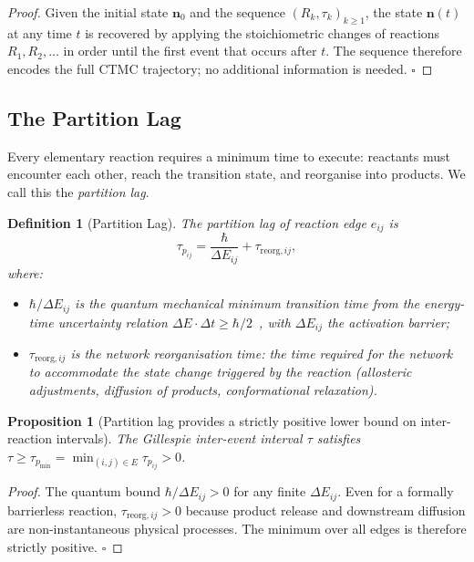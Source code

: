 \documentclass[twocolumn,10pt,a4paper]{article}
\newcommand{\taup}{\tau_p}
\newtheorem{proposition}[theorem]{Proposition}
\newtheorem{definition}[theorem]{Definition}
\begin{document}
\begin{proof}
Given the initial state $\mathbf{n}_0$ and the sequence $(R_k,\tau_k)_{k\geq 1}$,
the state $\mathbf{n}(t)$ at any time $t$ is recovered by applying the
stoichiometric changes of reactions $R_1,R_2,\ldots$ in order until the first
event that occurs after $t$.  The sequence therefore encodes the full CTMC
trajectory; no additional information is needed.  $\square$
\end{proof}

\subsection{The Partition Lag}
\label{sec:time-lag}

Every elementary reaction requires a minimum time to execute: reactants must
encounter each other, reach the transition state, and reorganise into products.
We call this the \emph{partition lag}.

\begin{definition}[Partition Lag]
\label{def:partition-lag}
The \emph{partition lag} of reaction edge $e_{ij}$ is
\begin{equation}
  \taup_{ij} = \frac{\hbar}{\Delta E_{ij}} + \tau_{\mathrm{reorg},ij},
  \label{eq:partition-lag}
\end{equation}
where:
\begin{itemize}[noitemsep]
  \item $\hbar/\Delta E_{ij}$ is the quantum mechanical minimum transition time
        from the energy-time uncertainty relation
        $\Delta E\cdot\Delta t\geq\hbar/2$~\cite{Heisenberg1927}, with
        $\Delta E_{ij}$ the activation barrier;
  \item $\tau_{\mathrm{reorg},ij}$ is the network reorganisation time: the
        time required for the network to accommodate the state change triggered
        by the reaction (allosteric adjustments, diffusion of products,
        conformational relaxation).
\end{itemize}
\end{definition}

\begin{proposition}[Partition lag provides a strictly positive lower bound on inter-reaction intervals]
\label{prop:lag-minimum}
The Gillespie inter-event interval $\tau$ satisfies
$\tau\geq\taup_{\min}=\min_{(i,j)\in E}\taup_{ij}>0$.
\end{proposition}

\begin{proof}
The quantum bound $\hbar/\Delta E_{ij}>0$ for any finite $\Delta E_{ij}$.
Even for a formally barrierless reaction, $\tau_{\mathrm{reorg},ij}>0$ because
product release and downstream diffusion are non-instantaneous physical
processes.  The minimum over all edges is therefore strictly positive.
$\square$
\end{proof}
\end{document}
